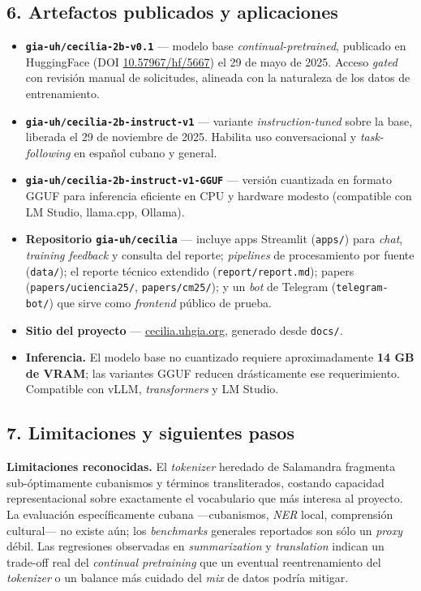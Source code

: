 \documentclass[
  spanish,
  letterpaper,
  DIV=11,
  numbers=noendperiod]{scrartcl}
\providecommand{\tightlist}{%
  \setlength{\itemsep}{0pt}\setlength{\parskip}{0pt}}
\begin{document}
\subsection{6. Artefactos publicados y
aplicaciones}\label{artefactos-publicados-y-aplicaciones}

\begin{itemize}
\tightlist
\item
  \textbf{\texttt{gia-uh/cecilia-2b-v0.1}} --- modelo base
  \emph{continual-pretrained}, publicado en HuggingFace (DOI
  \href{https://doi.org/10.57967/hf/5667}{10.57967/hf/5667}) el 29 de
  mayo de 2025. Acceso \emph{gated} con revisión manual de solicitudes,
  alineada con la naturaleza de los datos de entrenamiento.
\item
  \textbf{\texttt{gia-uh/cecilia-2b-instruct-v1}} --- variante
  \emph{instruction-tuned} sobre la base, liberada el 29 de noviembre de
  2025. Habilita uso conversacional y \emph{task-following} en español
  cubano y general.
\item
  \textbf{\texttt{gia-uh/cecilia-2b-instruct-v1-GGUF}} --- versión
  cuantizada en formato GGUF para inferencia eficiente en CPU y hardware
  modesto (compatible con LM Studio, llama.cpp, Ollama).
\item
  \textbf{Repositorio \texttt{gia-uh/cecilia}} --- incluye apps
  Streamlit (\texttt{apps/}) para \emph{chat}, \emph{training feedback}
  y consulta del reporte; \emph{pipelines} de procesamiento por fuente
  (\texttt{data/}); el reporte técnico extendido
  (\texttt{report/report.md}); papers (\texttt{papers/uciencia25/},
  \texttt{papers/cm25/}); y un \emph{bot} de Telegram
  (\texttt{telegram-bot/}) que sirve como \emph{frontend} público de
  prueba.
\item
  \textbf{Sitio del proyecto} ---
  \href{https://cecilia.uhgia.org}{cecilia.uhgia.org}, generado desde
  \texttt{docs/}.
\item
  \textbf{Inferencia.} El modelo base no cuantizado requiere
  aproximadamente \textbf{14 GB de VRAM}; las variantes GGUF reducen
  drásticamente ese requerimiento. Compatible con vLLM,
  \emph{transformers} y LM Studio.
\end{itemize}

\subsection{7. Limitaciones y siguientes
pasos}\label{limitaciones-y-siguientes-pasos}

\textbf{Limitaciones reconocidas.} El \emph{tokenizer} heredado de
Salamandra fragmenta sub-óptimamente cubanismos y términos
transliterados, costando capacidad representacional sobre exactamente el
vocabulario que más interesa al proyecto. La evaluación específicamente
cubana ---cubanismos, \emph{NER} local, comprensión cultural--- no
existe aún; los \emph{benchmarks} generales reportados son sólo un
\emph{proxy} débil. Las regresiones observadas en \emph{summarization} y
\emph{translation} indican un trade-off real del \emph{continual
pretraining} que un eventual reentrenamiento del \emph{tokenizer} o un
balance más cuidado del \emph{mix} de datos podría mitigar.
\end{document}
